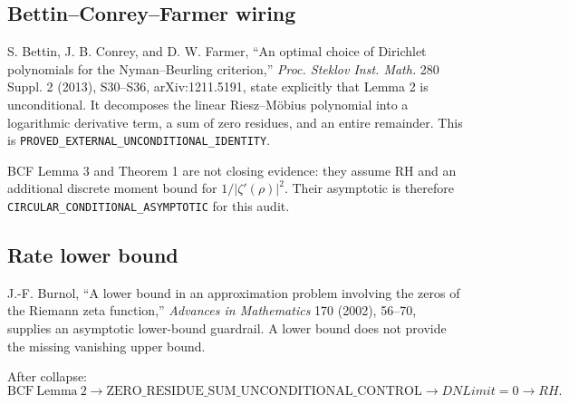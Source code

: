 \subsection*{Bettin--Conrey--Farmer wiring}
S. Bettin, J. B. Conrey, and D. W. Farmer, ``An optimal choice of Dirichlet polynomials for the Nyman--Beurling criterion,'' \emph{Proc. Steklov Inst. Math.} 280 Suppl. 2 (2013), S30--S36, arXiv:1211.5191, state explicitly that Lemma 2 is unconditional. It decomposes the linear Riesz--M\"obius polynomial into a logarithmic derivative term, a sum of zero residues, and an entire remainder. This is \texttt{PROVED\_EXTERNAL\_UNCONDITIONAL\_IDENTITY}.

BCF Lemma 3 and Theorem 1 are not closing evidence: they assume RH and an additional discrete moment bound for $1/|\zeta'(\rho)|^2$. Their asymptotic is therefore \texttt{CIRCULAR\_CONDITIONAL\_ASYMPTOTIC} for this audit.

\subsection*{Rate lower bound}
J.-F. Burnol, ``A lower bound in an approximation problem involving the zeros of the Riemann zeta function,'' \emph{Advances in Mathematics} 170 (2002), 56--70, supplies an asymptotic lower-bound guardrail. A lower bound does not provide the missing vanishing upper bound.

After collapse:
\[
\mathrm{BCF\ Lemma\ 2}\longrightarrow\boxed{\mathrm{ZERO\_RESIDUE\_SUM\_UNCONDITIONAL\_CONTROL}}\longrightarrow DNLimit=0\longrightarrow RH.
\]
